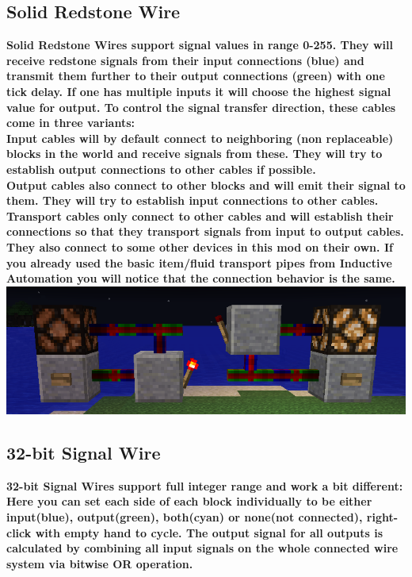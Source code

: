 \documentclass[11pt]{article} %
\begin{document}
\subsection{Solid Redstone Wire}
\bf Solid Redstone Wires \rm support signal values in range 0-255. They will receive redstone signals from their input connections (blue) and transmit them further to their output connections (green) with one tick delay. If one has multiple inputs it will choose the highest signal value for output. To control the signal transfer direction, these cables come in three variants:\\
\bf Input cables \rm will by default connect to neighboring (non replaceable) blocks in the world and receive signals from these. They will try to establish output connections to other cables if possible.\\
\bf Output cables \rm also connect to other blocks and will emit their signal to them. They will try to establish input connections to other cables.\\
\bf Transport cables \rm only connect to other cables and will establish their connections so that they transport signals from input to output cables. They also connect to some other devices in this mod on their own. If you already used the basic item/fluid transport pipes from \bf Inductive Automation \rm you will notice that the connection behavior is the same.\\
\includegraphics[width=\textwidth]{1_bit_pipes}\\

\subsection{32-bit Signal Wire}
\bf 32-bit Signal Wires \rm support full integer range and work a bit different:
Here you can set each side of each block individually to be either input(blue), output(green), both(cyan) or none(not connected), right-click with empty hand to cycle. The output signal for all outputs is calculated by combining all input signals on the whole connected wire system via bitwise OR operation.
\end{document}
